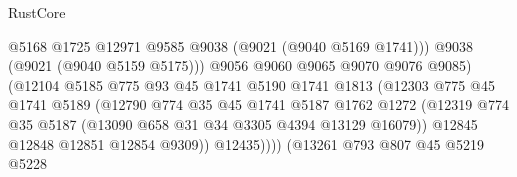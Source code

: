 \begin{lexlean}{RustCore}
\begin{coremodule}
                                            @5168
                                            @1725
                                            @12971
                                            @9585
                                            @9038
                                            (@9021 (@9040 @5169 @1741)))
                                          @9038
                                          (@9021 (@9040 @5159 @5175)))
                                        @9056
                                        @9060
                                        @9065
                                        @9070
                                        @9076
                                        @9085)
                                      (@12104
                                        @5185
                                        @775
                                        @93
                                        @45
                                        @1741
                                        @5190
                                        @1741
                                        @1813
                                        (@12303
                                          @775
                                          @45
                                          @1741
                                          @5189
                                          (@12790
                                            @774
                                            @35
                                            @45
                                            @1741
                                            @5187
                                            @1762
                                            @1272
                                            (@12319
                                              @774
                                              @35
                                              @5187
                                              (@13090 @658 @31 @34 @3305 @4394 @13129 @16079))
                                            @12845
                                            @12848
                                            @12851
                                            @12854
                                            @9309))
                                        @12435))))
                                (@13261
                                  @793
                                  @807
                                  @45
                                  @5219
                                  @5228

\end{coremodule}
\end{lexlean}
